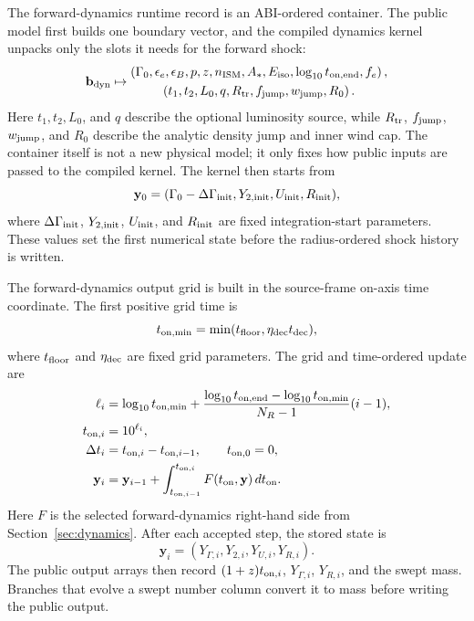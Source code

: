 \documentclass[twocolumn]{aastex702}
\begin{document}
The forward-dynamics runtime record is an ABI-ordered container.  The public
model first builds one boundary vector, and the compiled dynamics kernel unpacks
only the slots it needs for the forward shock:
\begin{equation}
\mathbf b_{\rm dyn}\mapsto
\begin{gathered}
\left(
\Gamma_0,\epsilon_e,\epsilon_B,p,z,n_{\rm ISM},A_\ast,E_{\rm iso},
\log_{10}t_{{\rm on},\rm end},f_e
\right),\\
\left(
t_1,t_2,L_0,q,R_{\rm tr},f_{\rm jump},w_{\rm jump},R_0
\right).
\end{gathered}
\end{equation}
Here \(t_1,t_2,L_0\), and \(q\) describe the optional luminosity source, while
\(R_{\rm tr}\), \(f_{\rm jump}\), \(w_{\rm jump}\), and \(R_0\) describe the
analytic density jump and inner wind cap.  The container itself is not a new
physical model; it only fixes how public inputs are passed to the compiled
kernel.  The kernel then starts from
\begin{equation}
\mathbf{y}_0=(\Gamma_0-\Delta\Gamma_{\rm init},
Y_{2,{\rm init}},U_{\rm init},R_{\rm init}),
\end{equation}
where \(\Delta\Gamma_{\rm init}\), \(Y_{2,{\rm init}}\), \(U_{\rm init}\), and
\(R_{\rm init}\) are fixed integration-start parameters.  These values set the
first numerical state before the radius-ordered shock history is written.

The forward-dynamics output grid is built in the source-frame on-axis time
coordinate.  The first positive grid time is
\begin{equation}
t_{{\rm on},\min}=\min(t_{\rm floor},\eta_{\rm dec}t_{\rm dec}) ,
\end{equation}
where \(t_{\rm floor}\) and \(\eta_{\rm dec}\) are fixed grid parameters.  The
grid and time-ordered update are
\begin{equation}
\begin{aligned}
\ell_i&=\log_{10}t_{{\rm on},\min}
+\frac{\log_{10}t_{{\rm on},\rm end}
-\log_{10}t_{{\rm on},\min}}{N_R-1}(i-1),\\
t_{{\rm on},i}&=10^{\ell_i},\\
\Delta t_i&=t_{{\rm on},i}-t_{{\rm on},i-1},\qquad t_{{\rm on},0}=0,\\
\mathbf{y}_i&=\mathbf{y}_{i-1}
+\int_{t_{{\rm on},i-1}}^{t_{{\rm on},i}}
F(t_{\rm on},\mathbf{y})\,dt_{\rm on}.
\end{aligned}
\end{equation}
Here \(F\) is the selected forward-dynamics right-hand side from
Section~\ref{sec:dynamics}.  After each accepted step, the stored state is
\begin{equation}
\mathbf{y}_i=(Y_{\Gamma,i},Y_{2,i},Y_{U,i},Y_{R,i}).
\end{equation}
The public output arrays then record \((1+z)t_{{\rm on},i}\), \(Y_{\Gamma,i}\),
\(Y_{R,i}\), and the swept mass.  Branches that evolve a swept number column
convert it to mass before writing the public output.
\end{document}
